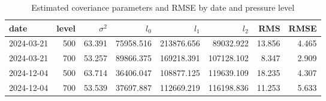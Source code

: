 \begin{table}
\caption{Estimated coveriance parameters and RMSE by date and pressure level}
\label{tab:params_rmse}
\begin{tabular}{lrrrrrrr}
\toprule
date & level & $\sigma^2$ & $l_0$ & $l_1$ & $l_2$ & RMS & RMSE \\
\midrule
2024-03-21 & 500 & 63.391 & 75958.516 & 213876.656 & 89032.922 & 13.856 & 4.465 \\
2024-03-21 & 700 & 53.257 & 89866.375 & 169218.391 & 107128.102 & 8.347 & 2.909 \\
2024-12-04 & 500 & 63.714 & 36406.047 & 108877.125 & 119639.109 & 18.235 & 4.307 \\
2024-12-04 & 700 & 53.539 & 37697.887 & 112669.219 & 116198.836 & 11.253 & 5.633 \\
\bottomrule
\end{tabular}
\end{table}
